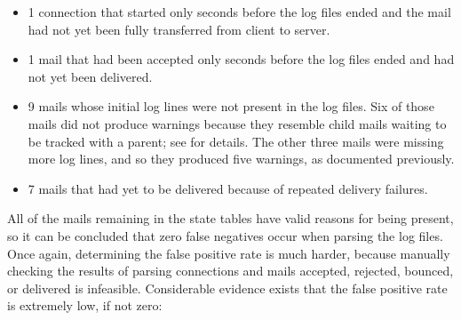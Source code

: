 \begin{itemize}

    \squeezeitems{}

    \item 1 connection that started only seconds before the log files ended
        and the mail had not yet been fully transferred from client to
        server.

    \item 1 mail that had been accepted only seconds before the log files
        ended and had not yet been delivered.

    \item 9 mails whose initial log lines were not present in the log
        files.  Six of those mails did not produce warnings because they
        resemble child mails waiting to be tracked with a parent; see
         for details.  The other three mails
        were missing more log lines, and so they produced five warnings, as
        documented previously.

    \item 7 mails that had yet to be delivered because of repeated
        delivery failures.

\end{itemize}

All of the mails remaining in the state tables have valid reasons for being
present, so it can be concluded that zero false negatives occur when
parsing the \numberOFlogFILES{} log files.  Once again, determining the
false positive rate is much harder, because manually checking the results
of parsing \numberOFconnectionsINlogFILES{} connections and mails accepted,
rejected, bounced, or delivered is infeasible.  Considerable evidence
exists that the false positive rate is extremely low, if not zero:

